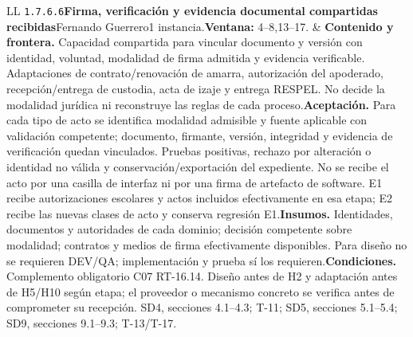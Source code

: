 \begin{longtable}{L{\tabcolsep\relax}L{\tabcolsep\relax}}
\texttt{1.\allowbreak{}7.\allowbreak{}6.\allowbreak{}6}\newline{}\textbf{Firma, verificación y evidencia documental compartidas recibidas}\newline{}Fernando Guerrero\newline{}1 instancia.\newline{}\textbf{Ventana:} 4--8,13--17. & \textbf{Contenido y frontera.} Capacidad compartida para vincular documento y versión con identidad, voluntad, modalidad de firma admitida y evidencia verificable. Adaptaciones de contrato/renovación de amarra, autorización del apoderado, recepción/entrega de custodia, acta de izaje y entrega RESPEL. No decide la modalidad jurídica ni reconstruye las reglas de cada proceso.\newline{}\textbf{Aceptación.} Para cada tipo de acto se identifica modalidad admisible y fuente aplicable con validación competente; documento, firmante, versión, integridad y evidencia de verificación quedan vinculados. Pruebas positivas, rechazo por alteración o identidad no válida y conservación/exportación del expediente. No se recibe el acto por una casilla de interfaz ni por una firma de artefacto de software. E1 recibe autorizaciones escolares y actos incluidos efectivamente en esa etapa; E2 recibe las nuevas clases de acto y conserva regresión E1.\newline{}\textbf{Insumos.} Identidades, documentos y autoridades de cada dominio; decisión competente sobre modalidad; contratos y medios de firma efectivamente disponibles. Para diseño no se requieren DEV/QA; implementación y prueba sí los requieren.\newline{}\textbf{Condiciones.} Complemento obligatorio C07 RT-16.14. Diseño antes de H2 y adaptación antes de H5/H10 según etapa; el proveedor o mecanismo concreto se verifica antes de comprometer su recepción. SD4, secciones 4.1--4.3; T-11; SD5, secciones 5.1--5.4; SD9, secciones 9.1--9.3; T-13/T-17.\\\hline

\end{longtable}
